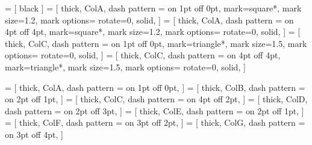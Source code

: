 




 = [
black
]
 = [
thick, ColA, dash pattern = {on 1pt off 0pt},
	mark=square*, mark size=1.2, mark options={
		rotate=0,
		solid,
	}
]
 = [
thick, ColA, dash pattern = {on 4pt off 4pt},
	mark=square*, mark size=1.2, mark options={
		rotate=0,
		solid,
	}
]
 = [
thick, ColC, dash pattern = {on 1pt off 0pt},
	mark=triangle*, mark size=1.5, mark options={
		rotate=0,
		solid,
	}
]
 = [
thick, ColC, dash pattern = {on 4pt off 4pt},
	mark=triangle*, mark size=1.5, mark options={
		rotate=0,
		solid,
	}
]


 = [
thick, ColA, dash pattern = {on 1pt off 0pt},
]
 = [
thick, ColB, dash pattern = {on 2pt off 1pt},
]
 = [
thick, ColC, dash pattern = {on 4pt off 2pt},
]
 = [
thick, ColD, dash pattern = {on 2pt off 3pt},
]
 = [
thick, ColE, dash pattern = {on 2pt off 1pt},
]
 = [
thick, ColF, dash pattern = {on 3pt off 2pt},
]
 = [
thick, ColG, dash pattern = {on 3pt off 4pt},
]
